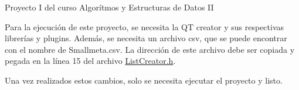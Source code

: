 Proyecto I del curso Algorítmos y Estructuras de Datos II

Para la ejecución de este proyecto, se necesita la QT creator y sus respectivas librerías y plugins. Además, se necesita un archivo csv, que se puede encontrar con el nombre de {\ttfamily Smallmeta.\+csv}. La dirección de este archivo debe ser copiada y pegada en la línea 15 del archivo {\ttfamily \mbox{\hyperlink{_list_creator_8h}{List\+Creator.\+h}}}.

Una vez realizados estos cambios, solo se necesita ejecutar el proyecto y listo. 